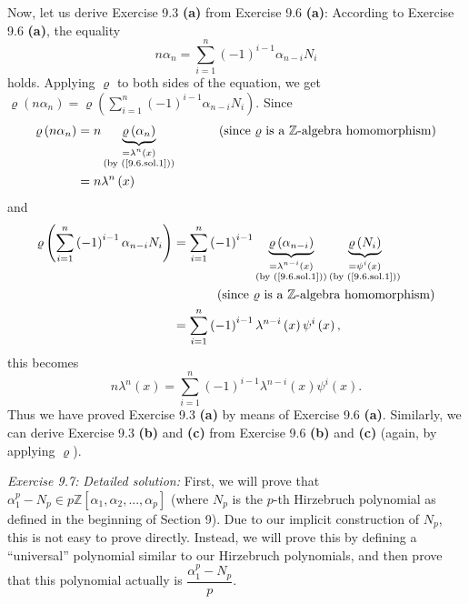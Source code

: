 \documentclass[numbers=enddot,12pt,final,onecolumn,notitlepage]{scrartcl}%
\begin{document}
Now, let us derive Exercise 9.3 \textbf{(a)} from Exercise 9.6 \textbf{(a)}:
According to Exercise 9.6 \textbf{(a)}, the equality%
\[
n\alpha_{n}=\sum_{i=1}^{n}\left(  -1\right)  ^{i-1}\alpha_{n-i}N_{i}%
\]
holds. Applying $\varrho$ to both sides of the equation, we get $\varrho
\left(  n\alpha_{n}\right)  =\varrho\left(  \sum\limits_{i=1}^{n}\left(
-1\right)  ^{i-1}\alpha_{n-i}N_{i}\right)  $. Since%
\begin{align*}
\varrho\left(  n\alpha_{n}\right)   &  =n\underbrace{\varrho\left(  \alpha
_{n}\right)  }_{\substack{=\lambda^{n}\left(  x\right)  \\\text{(by
(\ref{9.6.sol.1}))}}}\ \ \ \ \ \ \ \ \ \ \left(  \text{since }\varrho\text{ is
a }\mathbb{Z}\text{-algebra homomorphism}\right) \\
&  =n\lambda^{n}\left(  x\right)
\end{align*}
and%
\begin{align*}
\varrho\left(  \sum\limits_{i=1}^{n}\left(  -1\right)  ^{i-1}\alpha_{n-i}%
N_{i}\right)   &  =\sum\limits_{i=1}^{n}\left(  -1\right)  ^{i-1}%
\underbrace{\varrho\left(  \alpha_{n-i}\right)  }_{\substack{=\lambda
^{n-i}\left(  x\right)  \\\text{(by (\ref{9.6.sol.1}))}}}\underbrace{\varrho
\left(  N_{i}\right)  }_{\substack{=\psi^{i}\left(  x\right)  \\\text{(by
(\ref{9.6.sol.1}))}}}\\
&  \ \ \ \ \ \ \ \ \ \ \left(  \text{since }\varrho\text{ is a }%
\mathbb{Z}\text{-algebra homomorphism}\right) \\
&  =\sum\limits_{i=1}^{n}\left(  -1\right)  ^{i-1}\lambda^{n-i}\left(
x\right)  \psi^{i}\left(  x\right)  ,
\end{align*}
this becomes%
\[
n\lambda^{n}\left(  x\right)  =\sum\limits_{i=1}^{n}\left(  -1\right)
^{i-1}\lambda^{n-i}\left(  x\right)  \psi^{i}\left(  x\right)  .
\]
Thus we have proved Exercise 9.3 \textbf{(a)} by means of Exercise 9.6
\textbf{(a)}. Similarly, we can derive Exercise 9.3 \textbf{(b)} and
\textbf{(c)} from Exercise 9.6 \textbf{(b)} and \textbf{(c)} (again, by
applying $\varrho$).

\textit{Exercise 9.7:} \textit{Detailed solution:} First, we will prove that
$\alpha_{1}^{p}-N_{p}\in p\mathbb{Z}\left[  \alpha_{1},\alpha_{2}%
,...,\alpha_{p}\right]  $ (where $N_{p}$ is the $p$-th Hirzebruch polynomial
as defined in the beginning of Section 9). Due to our implicit construction of
$N_{p}$, this is not easy to prove directly. Instead, we will prove this by
defining a ``universal'' polynomial similar to our Hirzebruch polynomials, and
then prove that this polynomial actually is $\dfrac{\alpha_{1}^{p}-N_{p}}{p}$.
\end{document}
